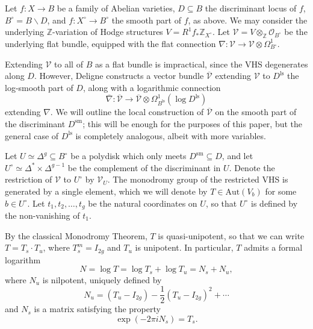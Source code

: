 \documentclass[12pt]{amsart}
\newcommand{\Z}{\mathbb{Z}}
\newcommand{\Aut}{\mathrm{Aut}}
\newcommand{\cV}{\mathcal{V}}
\newcommand{\ol}{\overline}
\theoremstyle{definition}
\numberwithin{equation}{section}
\begin{document}
Let \(f: X \to B\) be a family of Abelian varieties, \(D \subseteq B\) the discriminant 
locus of \(f\), \(B^\circ = B \smallsetminus D\), and \(f: X^\circ \to B^\circ\) the 
smooth part of \(f\), as above. We may consider the underlying \(\Z\)-variation of Hodge 
structures \(V = R^1 f_* \Z_{X^\circ}\). Let \(\cV = V \otimes_{\Z} \mathcal{O}_{B^\circ}\) 
be the underlying flat bundle, equipped with the flat connection 
\(\nabla: \cV \to \cV \otimes \Omega_{B^\circ}^1\).

Extending \(\cV\) to all of \(B\) as a flat bundle is impractical, since the VHS 
degenerates along \(D\). However, Deligne constructs a vector bundle \(\ol{\cV}\) 
extending \(\cV\) to \(D^\mathrm{ls}\) the log-smooth part of \(D\), 
along with a logarithmic connection 
\begin{equation*}
    \ol{\nabla}: \ol{\cV} \to \ol{\cV} \otimes \Omega_{B^\mathrm{ls}}^1(\log D^\mathrm{ls})
\end{equation*}
extending \(\nabla\). 
We will outline the local construction of \(\ol{\cV}\) on the smooth part of the 
discriminant \(D^\mathrm{sm}\); this will be enough for the purposes of this paper,
but the general case of \(D^\mathrm{ls}\) is completely analogous, albeit with more
variables. 

Let \(U \simeq \Delta^{g} \subseteq B^\circ\) be a polydisk which only meets 
\(D^\mathrm{sm} \subseteq D\), and let \(U^\circ \simeq \Delta^* \times \Delta^{g-1}\) be 
the complement of the discriminant in \(U\). Denote the restriction of \(\cV\) to 
\(U^\circ\) by \(\cV_U\). The monodromy group of the restricted VHS is generated 
by a single element, which we will denote by \(T \in \Aut(V_b)\) for some 
\(b \in U^\circ\). Let \(t_1, t_2, \dots, t_g\) be the natural coordinates
on \(U\), so that \(U^\circ\) is defined by the non-vanishing of \(t_1\). 

By the classical Monodromy Theorem, \(T\) is quasi-unipotent, so that we can write 
\(T = T_s \cdot T_u\), where \(T_s^m = I_{2g}\) and \(T_u\) is unipotent. In particular,
\(T\) admits a formal logarithm 
\begin{equation*}
    N = \log T = \log T_s + \log T_u = N_s + N_u,
\end{equation*}
where \(N_u\) is nilpotent, uniquely defined by 
\begin{equation*}
    N_u = (T_u - I_{2g}) - \frac{1}{2} (T_u - I_{2g})^2 + \cdots
\end{equation*}
and \(N_s\) is a matrix satisfying the property 
\begin{equation*}
    \exp(-2\pi i N_s) = T_s.
\end{equation*}
\end{document}
